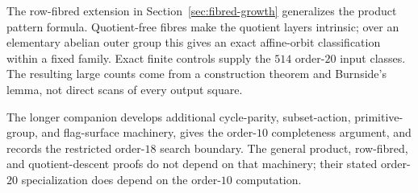 The row-fibred extension in Section~\ref{sec:fibred-growth} generalizes
the product pattern formula. Quotient-free fibres make the quotient layers
intrinsic; over an elementary abelian outer group this gives an exact
affine-orbit classification within a fixed family. Exact finite controls
supply the $514$ order-$20$ input classes. The resulting large counts
come from a construction theorem and Burnside's lemma, not direct scans
of every output square.

The longer companion develops additional cycle-parity, subset-action,
primitive-group, and flag-surface machinery, gives the order-$10$
completeness argument, and records the restricted order-$18$ search
boundary. The general product, row-fibred, and quotient-descent
proofs do not depend on that machinery; their stated order-$20$
specialization does depend on the order-$10$ computation.
